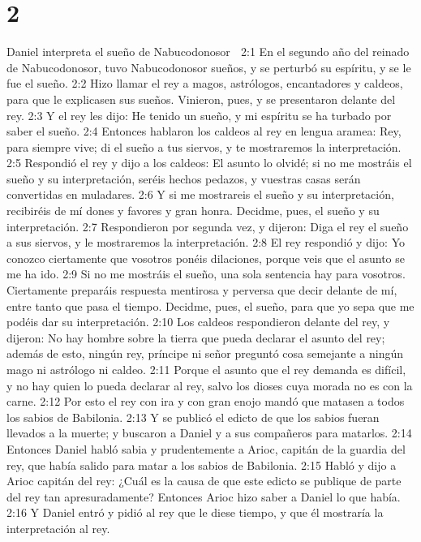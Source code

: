 \chapter{2}

Daniel interpreta el sueño de Nabucodonosor  

2:1 En el segundo año del reinado de Nabucodonosor, tuvo Nabucodonosor sueños, y se perturbó su espíritu, y se le fue el sueño.  
2:2 Hizo llamar el rey a magos, astrólogos, encantadores y caldeos, para que le explicasen sus sueños. Vinieron, pues, y se presentaron delante del rey.  
2:3 Y el rey les dijo: He tenido un sueño, y mi espíritu se ha turbado por saber el sueño.  
2:4 Entonces hablaron los caldeos al rey en lengua aramea: Rey, para siempre vive; di el sueño a tus siervos, y te mostraremos la interpretación.  
2:5 Respondió el rey y dijo a los caldeos: El asunto lo olvidé; si no me mostráis el sueño y su interpretación, seréis hechos pedazos, y vuestras casas serán convertidas en muladares.  
2:6 Y si me mostrareis el sueño y su interpretación, recibiréis de mí dones y favores y gran honra. Decidme, pues, el sueño y su interpretación.  
2:7 Respondieron por segunda vez, y dijeron: Diga el rey el sueño a sus siervos, y le mostraremos la interpretación.  
2:8 El rey respondió y dijo: Yo conozco ciertamente que vosotros ponéis dilaciones, porque veis que el asunto se me ha ido.  
2:9 Si no me mostráis el sueño, una sola sentencia hay para vosotros. Ciertamente preparáis respuesta mentirosa y perversa que decir delante de mí, entre tanto que pasa el tiempo. Decidme, pues, el sueño, para que yo sepa que me podéis dar su interpretación.  
2:10 Los caldeos respondieron delante del rey, y dijeron: No hay hombre sobre la tierra que pueda declarar el asunto del rey; además de esto, ningún rey, príncipe ni señor preguntó cosa semejante a ningún mago ni astrólogo ni caldeo.  
2:11 Porque el asunto que el rey demanda es difícil, y no hay quien lo pueda declarar al rey, salvo los dioses cuya morada no es con la carne.  
2:12 Por esto el rey con ira y con gran enojo mandó que matasen a todos los sabios de Babilonia.  
2:13 Y se publicó el edicto de que los sabios fueran llevados a la muerte; y buscaron a Daniel y a sus compañeros para matarlos.  
2:14 Entonces Daniel habló sabia y prudentemente a Arioc, capitán de la guardia del rey, que había salido para matar a los sabios de Babilonia.  
2:15 Habló y dijo a Arioc capitán del rey: ¿Cuál es la causa de que este edicto se publique de parte del rey tan apresuradamente? Entonces Arioc hizo saber a Daniel lo que había.  
2:16 Y Daniel entró y pidió al rey que le diese tiempo, y que él mostraría la interpretación al rey.  
